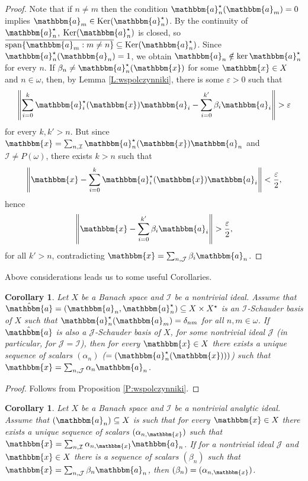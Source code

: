 \documentclass[10pt,a4paper]{amsart}
\newcommand{\on}{\operatorname}
\newcommand{\I}{\mathcal{I}}
\newcommand{\J}{\mathcal{J}}
\newcommand{\w}{\mathbbm}
\newtheorem{corollary}[theorem]{Corollary}
\begin{document}
\begin{proof}
    Note that if $n\neq m$ then the condition $\w{a}^\star_n(\w{a}_m)=0$ implies $\w{a}_m\in \on{Ker}(\w{a}^\star_n)$. By the continuity of $\w{a}_n^\star$, $\on{Ker}(\w{a}^\star_n)$ is closed, so $\overline{\on{span}\{\w{a}_m: m \neq n\}}\subseteq \on{Ker}(\w{a}^\star_n)$. Since $\w{a}_n^\star(\w{a}_n)=1$, we obtain $\w{a}_n \notin \on{ker}\w{a}^\star_n$ for every $n$. If $\beta_n\neq \w{a}_n^\star(\w{x})$ for some $\w{x}\in X$ and $n\in \omega$, then, by Lemma \ref{L:wspolczynniki}, there is some $\varepsilon>0$ such that 
    \[
    \left\|\sum_{i=0}^k \w{a}^\star_i(\w{x}) \w{a}_i- \sum_{i=0}^{k'} \beta_i \w{a}_i \right\|>\varepsilon
    \]
    for every $k,k'>n$. But since $\w{x}=\sum_{n,\I} \w{a}^\star_n(\w{x}) \w{a}_n$ and $\I\neq P(\omega)$, there exists $k>n$ such that 
    \[
     \left\|\w{x}-\sum_{i=0}^k \w{a}^\star_i(\w{x}) \w{a}_i\right\|<\frac{\varepsilon}{2},
    \]
    hence 
    \[
     \left\|\w{x}-\sum_{i=0}^{k'} \beta_i \w{a}_i\right\|>\frac{\varepsilon}{2},
    \]
    for all $k'>n$, contradicting $\w{x}= \sum_{n,\J} \beta_i \w{a}_n$.
\end{proof}

Above considerations leads us to some useful Corollaries.

\begin{corollary}
Let $X$ be a Banach space and $\I$ be a nontrivial ideal. Assume that $\hat{\w{a}}=(\w{a}_n,\w{a}^\star_n)\subseteq X\times X^\star$ is an $\I$-Schauder basis of $X$ such that $\w{a}^\star_n(\w{a}_m)=\delta_{nm}$ for all $n,m\in\omega$. If $\hat{\w{a}}$ is also a $\J$-Schauder basis of $X$, for some nontrivial ideal $\J$ (in particular, for $\J=\I$), then for every $\w{x}\in X$ there exists a unique sequence of scalars $(\alpha_n)$ ($=(\w{a}_n^\star(\w{x})))$) such that $\w{x}=\sum_{n,\J}\alpha_n \w{a}_n$.
\end{corollary}

\begin{proof}
Follows from Proposition \ref{P:wspolczynniki}.
\end{proof}

\begin{corollary}
Let $X$ be a Banach space and $\I$ be a nontrivial analytic ideal. Assume that $(\w{a}_n)\subseteq X$ is such that for every $\w{x}\in X$ there exists a unique sequence of scalars $(\alpha_{n,\w{x}})$ such that $\w{x}=\sum_{n,\I}\alpha_{n,\w{x}} \w{a}_n$. If for a nontrivial ideal $\J$ and $\w{x}\in X$ there is a sequence of scalars $(\beta_n)$ such that $\w{x}=\sum_{n,\J}\beta_n \w{a}_n$, then $(\beta_n)=(\alpha_{n,\w{x}})$.
\end{corollary}
\end{document}
